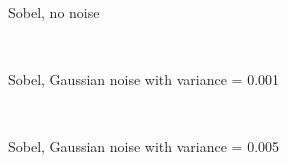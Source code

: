 \begin{figure}
  \centering
     \\
  \caption{Sobel, no noise}
  \label{fig:sobel_no_noise}
\end{figure}

\begin{figure}
  \centering
     \\
  \caption{Sobel, Gaussian noise with variance = 0.001}
  \label{fig:sobel_001}
\end{figure}

\begin{figure}
  \centering
     \\
  \caption{Sobel, Gaussian noise with variance = 0.005}
  \label{fig:sobel_005}
\end{figure}